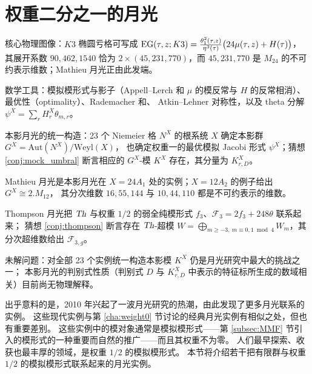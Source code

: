 \section{权重二分之一的月光}
\label{sec:Moonshine at weight one-half}

\begin{keytakeaways}
  \item 核心物理图像：$K3$ 椭圆亏格可写成 $\mathrm{EG}(\tau,z;K3)=\frac{\theta_1^2(\tau,z)}{\eta^3(\tau)}\big(24\mu(\tau,z)+H(\tau)\big)$，
        其展开系数 $90,462,1540$ 恰为 $2\times(45,231,770)$，而 $45,231,770$ 是 $M_{24}$ 的不可约表示维数；Mathieu 月光正由此发端。
  \item 数学工具：模拟模形式与影子（Appell--Lerch 和 $\mu$ 的模反常与 $H$ 的反常相消）、最优性（optimality）、Rademacher 和、
        Atkin--Lehner 对称性，以及 theta 分解 $\psi^X=\sum_r H^X_r\theta_{m,r}$。
  \item 本影月光的统一构造：23 个 Niemeier 格 $N^X$ 的根系统 $X$ 确定本影群 $G^X=\mathrm{Aut}(N^X)/\mathrm{Weyl}(X)$，
        也确定权重一的最优模拟 Jacobi 形式 $\psi^X$；猜想 \ref{conj:mock_umbral} 断言相应的 $G^X$-模 $K^X$ 存在，其分量为 $K^X_{r,D}$。
  \item Mathieu 月光是本影月光在 $X=24A_1$ 处的实例；$X=12A_2$ 的例子给出 $G^X\cong 2.M_{12}$，
        其分次维数 $16,55,144$ 与 $10,44,110$ 都是不可约表示的维数。
  \item Thompson 月光把 $\operatorname{\textsl{Th}}$ 与权重 $1/2$ 的弱全纯模形式 $f_3$、$\mathcal{F}_3=2f_3+248\theta$ 联系起来；
        猜想 \ref{conj:thompson} 断言存在 $\operatorname{\textsl{Th}}$-超模 $W=\bigoplus_{m\geq-3,\ m\equiv0,1\bmod4}W_m$，其分次超维数给出 $\mathcal{F}_{3,g}$。
  \item 未解问题：对全部 23 个实例统一构造本影模 $K^X$ 仍是月光研究中最大的挑战之一；
        本影月光的判别式性质（判别式 $D$ 与 $K^X_{r,D}$ 中表示的特征标所生成的数域相关）目前尚无物理解释。
\end{keytakeaways}


出乎意料的是，2010 年兴起了一波月光研究的热潮，由此发现了更多月光联系的实例。
这些现代实例与第 \ref{cha:weight0} 节讨论的经典月光实例有相似之处，但也有重要差别。
这些实例中的模对象通常是模拟模形式——第 \ref{subsec:MMF} 节引入的模形式的一种重要而自然的推广——而且其权重不为零。
人们最早探索、收获也最丰厚的领域，是权重 $1/2$ 的模拟模形式。
本节将介绍若干把有限群与权重 $1/2$ 的模拟模形式联系起来的月光实例。

